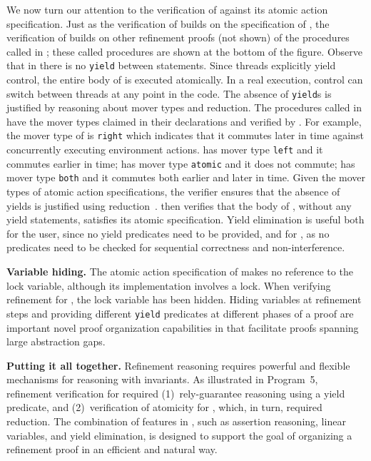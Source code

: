 We now turn our attention to the verification of  against
its atomic action specification.
Just as the verification of  builds on the specification of ,
the verification of  builds on other refinement proofs (not shown) 
of the procedures called in ;
these called procedures are shown at the bottom of the figure. 
Observe that in  there is no {\tt yield} between
statements. Since threads explicitly yield control, the
entire body of  is executed atomically. In
a real execution, control can switch between threads at any point in
the code. The absence of {\tt yield}s is justified by reasoning about
mover types and reduction. The procedures called in
 have the mover types claimed in their
declarations and verified by \civl. 
For example, the mover type of  is {\tt right} which indicates 
that it commutes later in time against concurrently executing environment actions.
 has mover type {\tt left} and it commutes earlier in time;
 has mover type {\tt atomic} and it does not commute;
 has mover type {\tt both} and it commutes both earlier and later in time.
Given the mover types of 
atomic action specifications, the \civl verifier ensures
that the absence of yields is justified using reduction~\cite{Lipton75}.  
\civl then verifies that the body of , without any yield statements, satisfies
its atomic specification. Yield elimination is useful both for the
user, since no yield predicates need to be provided, and for \civl,
as no predicates need to be checked for sequential correctness and
non-interference.

{\bf Variable hiding.} The atomic action specification of 
makes no reference to the lock variable, although its implementation
involves a lock. When verifying refinement for , the lock
variable has been hidden. Hiding variables at refinement steps and
providing different {\tt yield} predicates at different phases of a
proof are important novel proof organization capabilities in \civl
that facilitate proofs spanning large abstraction gaps.

{\bf Putting it all together.} 
Refinement reasoning requires powerful and
flexible mechanisms for reasoning with invariants.  
As illustrated in Program~5, refinement verification for  required 
(1)~rely-guarantee reasoning using a yield predicate, and 
(2)~verification of atomicity for , which, in turn, required reduction. 
The combination of features in \civl, such as assertion reasoning, linear variables, and yield elimination,
is designed to support the goal of organizing a
refinement proof in an efficient and natural way.
